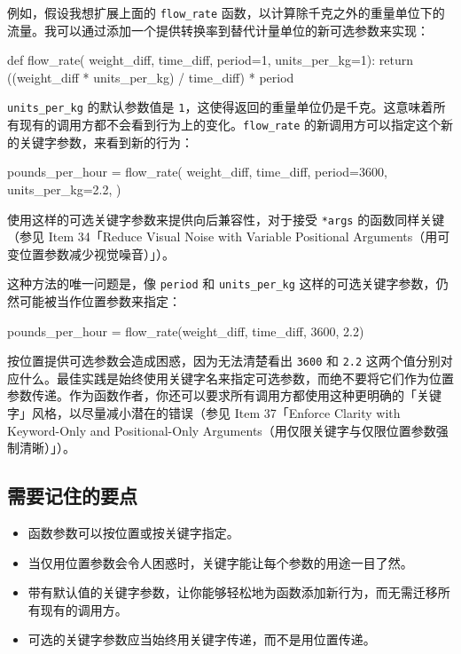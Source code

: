 例如，假设我想扩展上面的 \texttt{flow\_rate} 函数，以计算除千克之外的重量单位下的流量。我可以通过添加一个提供转换率到替代计量单位的新可选参数来实现：

\begin{codebox}[python]
def flow_rate( weight_diff, time_diff,
period=1, units_per_kg=1):
    return ((weight_diff * units_per_kg) / time_diff) * period
\end{codebox}

\texttt{units\_per\_kg} 的默认参数值是 \texttt{1}，这使得返回的重量单位仍是千克。这意味着所有现有的调用方都不会看到行为上的变化。\texttt{flow\_rate} 的新调用方可以指定这个新的关键字参数，来看到新的行为：

\begin{codebox}[python]
pounds_per_hour = flow_rate(
    weight_diff,
    time_diff,
    period=3600,
    units_per_kg=2.2,
)
\end{codebox}

使用这样的可选关键字参数来提供向后兼容性，对于接受 \texttt{*args} 的函数同样关键（参见 Item 34「Reduce Visual Noise with Variable Positional Arguments（用可变位置参数减少视觉噪音）」）。

这种方法的唯一问题是，像 \texttt{period} 和 \texttt{units\_per\_kg} 这样的可选关键字参数，仍然可能被当作位置参数来指定：

\begin{codebox}[python]
pounds_per_hour = flow_rate(weight_diff, time_diff, 3600, 2.2)
\end{codebox}

按位置提供可选参数会造成困惑，因为无法清楚看出 \texttt{3600} 和 \texttt{2.2} 这两个值分别对应什么。最佳实践是始终使用关键字名来指定可选参数，而绝不要将它们作为位置参数传递。作为函数作者，你还可以要求所有调用方都使用这种更明确的「关键字」风格，以尽量减小潜在的错误（参见 Item 37「Enforce Clarity with Keyword-Only and Positional-Only Arguments（用仅限关键字与仅限位置参数强制清晰）」）。

\subsection{需要记住的要点}

\begin{itemize}
\item 函数参数可以按位置或按关键字指定。
\item 当仅用位置参数会令人困惑时，关键字能让每个参数的用途一目了然。
\item 带有默认值的关键字参数，让你能够轻松地为函数添加新行为，而无需迁移所有现有的调用方。
\item 可选的关键字参数应当始终用关键字传递，而不是用位置传递。
\end{itemize}

